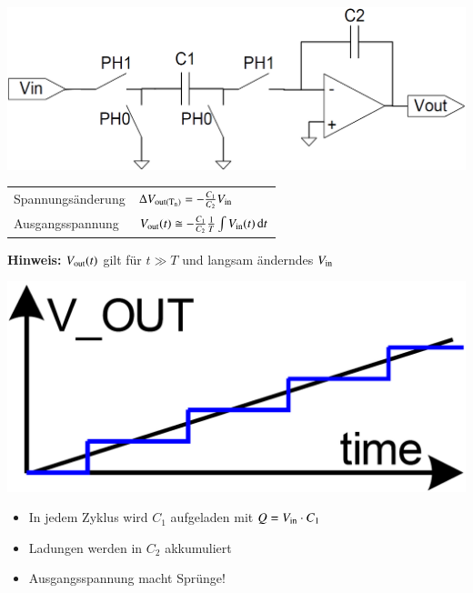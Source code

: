 \begin{minipage}[c]{0.4\columnwidth}
    \includegraphics[width=\columnwidth]{images/sc_integrator.png}
\end{minipage}
\hfill
\begin{minipage}[c]{0.58\columnwidth}
    \begin{tabular}{@{}ll@{}}
        Spannungsänderung   & $\Delta V_{\rm out(T_n)} = - \frac{C_1}{C_2} V_{\rm in}$ \\
        Ausgangsspannung    & $V_{\rm out}(t) \cong - \frac{C_1}{C_2} \frac{1}{T} \int V_{\rm in}(t) \mathop{} \! \mathrm{d} t$ \\
    \end{tabular}

    \textbf{Hinweis:} $V_{\rm out}(t)$ gilt für $t \gg T$ und langsam änderndes $V_{\rm in}$
\end{minipage}

\begin{minipage}[c]{0.25\columnwidth}
    \includegraphics[width=\columnwidth]{images/sc_integrator_verlauf.png}
\end{minipage}
\hfill
\begin{minipage}[c]{0.72\columnwidth}
    \begin{itemize}
        \item In jedem Zyklus wird $C_1$ aufgeladen mit $Q = V_{\rm in} \cdot C_1$
        \item Ladungen werden in $C_2$ akkumuliert
        \item Ausgangsspannung macht Sprünge!
    \end{itemize}
\end{minipage}


